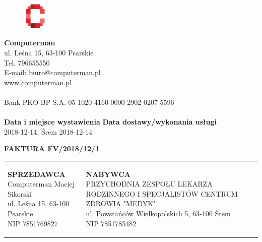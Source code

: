 \documentclass[a4paper,10pt]{article}
\date{}
\begin{document}
    \noindent
    \begin{figure}
	  \begin{center}
		\includegraphics[width=0.1\textwidth]{logo_fv.png}
	  \end{center}
    \end{figure}


    \noindent
    \textbf{Computerman}\\
    ul. Leśna 15, 63-100 Psarskie\\
    Tel. 796655550\\
    E-mail: biuro@computerman.pl\\
    www.computerman.pl\\
    \\
    Bank PKO BP S.A.
    05 1020 4160 0000 2902 0207 5596\\
    \\
  
\noindent
    \textbf{Data i miejsce wystawienia}		\hfill \textbf{Data dostawy/wykonania usługi}\\
    2018-12-14, Śrem							        \hfill	2018-12-14\\
  
    \begin{center}
    \textbf{\huge{FAKTURA FV/2018/12/1}}
    \end{center}
    \vspace{1,5cm}
  
    \noindent
    
    \begin{table}[H]
        \begin{tabular}{ p{8cm} p{8cm}}             
            {\parbox[t]{8cm}{\begin{flushleft}
                \textbf{SPRZEDAWCA}\\
            			Computerman Maciej Sikorski\\ ul. Leśna 15, 63-100 Psarskie \\  NIP 7851769827
            \end{flushleft} }} & {\parbox[t]{8cm}{\begin{flushright}
                \textbf{NABYWCA}\\
               PRZYCHODNIA ZESPOŁU LEKARZA RODZINNEGO I SPECJALISTÓW CENTRUM ZDROWIA "MEDYK"\\ ul. Powstańców Wielkopolskich 5, 63-100 Śrem \\ NIP 7851785482
\end{flushright}}}
        \end{tabular}
        \end{table}
  
\end{document}

